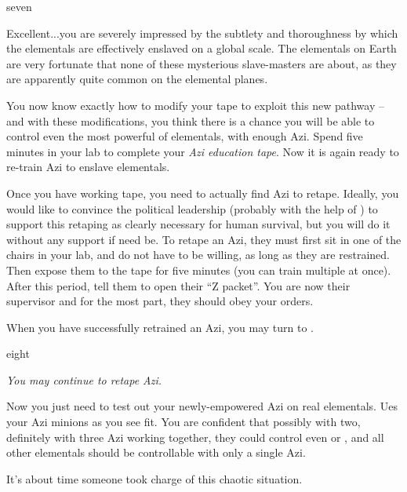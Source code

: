 \documentclass[notebook]{elementals}
\begin{document}
\begin{page}{seven}

Excellent...you are severely impressed by the subtlety and thoroughness by which the elementals are effectively enslaved on a global scale. The elementals on Earth are very fortunate that none of these mysterious slave-masters are about, as they are apparently quite common on the elemental planes.

You now know exactly how to modify your tape to exploit this new pathway -- and with these modifications, you think there is a chance you will be able to control even the most powerful of elementals, with enough Azi. Spend five minutes in your lab to complete your \emph{Azi education tape}. Now it is again ready to re-train Azi to enslave elementals.

Once you have working tape, you need to actually find Azi to retape. Ideally, you would like to convince the political leadership (probably with the help of \cDema{}) to support this retaping as clearly necessary for human survival, but you will do it without any support if need be. To retape an Azi, they must first sit in one of the chairs in your lab, and do not have to be willing, as long as they are restrained. Then expose them to the tape for five minutes (you can train multiple at once). After this period, tell them to open their ``Z packet''. You are now their supervisor and for the most part, they should obey your orders.

When you have successfully retrained an Azi, you may turn to .

\end{page}

\begin{page}{eight}

\emph{You may continue to retape Azi.}

Now you just need to test out your newly-empowered Azi on real elementals. Ues your Azi minions as you see fit. You are confident that possibly with two, definitely with three Azi working together, they could control even \cQueen{} or \cKing{}, and all other elementals should be controllable with only a single Azi.

It's about time someone took charge of this chaotic situation.

\end{page}

\endnotebook
\end{document}
